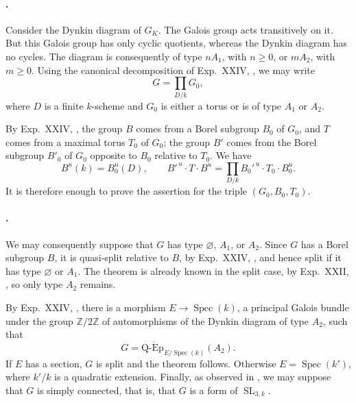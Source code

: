 \paragraph{.}
Consider the Dynkin diagram of \(G_K\).  The Galois group acts
transitively on it.  But this Galois group has only cyclic quotients,
whereas the Dynkin diagram has no cycles.  The diagram is consequently
of type \(nA_1\), with \(n\geq0\), or \(mA_2\), with \(m\geq0\).
Using the canonical decomposition of Exp.\ XXIV, , we may write
\[
 G=\prod_{D/k}G_0,
\]
where \(D\) is a finite \(k\)-scheme and \(G_0\) is either a torus or
is of type \(A_1\) or \(A_2\).

By Exp.\ XXIV, , the group \(B\) comes from a Borel subgroup
\(B_0\) of \(G_0\), and \(T\) comes from a maximal torus \(T_0\) of
\(G_0\); the group \(B'\) comes from the Borel subgroup \(B'_0\) of
\(G_0\) opposite to \(B_0\) relative to \(T_0\).  We have
\[
 B^{u}(k)=B_0^u(D),\qquad
 B'^{\,u}\cdot T\cdot B^u
 =\prod_{D/k}B_0'^{\,u}\cdot T_0\cdot B_0^u.
\]
It is therefore enough to prove the assertion for the triple
\((G_0,B_0,T_0)\).

\paragraph{.}
We may consequently suppose that \(G\) has type
\(\varnothing\), \(A_1\), or \(A_2\).  Since \(G\) has a Borel
subgroup \(B\), it is quasi-split relative to \(B\), by Exp.\ XXIV,
, and hence split if it has type \(\varnothing\) or \(A_1\).
The theorem is already known in the split case, by Exp.\ XXII,
, so only type \(A_2\) remains.

By Exp.\ XXIV, , there is a morphism
\(E\to\operatorname{Spec}(k)\), a principal Galois bundle under the
group \(\mathbb Z/2\mathbb Z\) of automorphisms of the Dynkin diagram
of type \(A_2\), such that
\[
 G=\operatorname{Q\text{-}\acute{E}p}_{E/\operatorname{Spec}(k)}
 (A_2).
\]
If \(E\) has a section, \(G\) is split and the theorem follows.
Otherwise \(E=\operatorname{Spec}(k')\), where \(k'/k\) is a quadratic
extension.  Finally, as observed in , we may suppose that \(G\)
is simply connected, that is, that \(G\) is a form of
\(\operatorname{SL}_{3,k}\).

